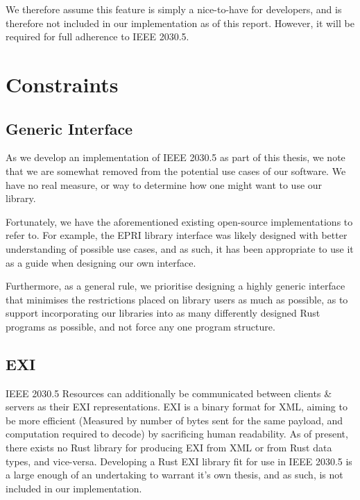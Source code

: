 We therefore assume this feature is simply a nice-to-have for developers, and is therefore not included in our implementation as of this report. However, it will be required for full adherence to IEEE 2030.5.

\section{Constraints}

\subsection{Generic Interface}
As we develop an implementation of IEEE 2030.5 as part of this thesis, we note that we are somewhat removed from the potential use cases of our software. We have no real measure, or way to determine how one might want to use our library. 

Fortunately, we have the aforementioned existing open-source implementations to refer to. For example, the EPRI library interface was likely designed with better understanding of possible use cases, and as such, it has been appropriate to use it as a guide when designing our own interface.

Furthermore, as a general rule, we prioritise designing a highly generic interface that minimises the restrictions placed on library users as much as possible, as to support incorporating our libraries into as many differently designed Rust programs as possible, and not force any one program structure.

\subsection{EXI}
IEEE 2030.5 Resources can additionally be communicated between clients \& servers as their EXI representations. EXI is a binary format for XML, aiming to be more efficient (Measured by number of bytes sent for the same payload, and computation required to decode) by sacrificing human readability. As of present, there exists no Rust library for producing EXI from XML or from Rust data types, and vice-versa.
Developing a Rust EXI library fit for use in IEEE 2030.5 is a large enough of an undertaking to warrant it's own thesis, and as such, is not included in our implementation.